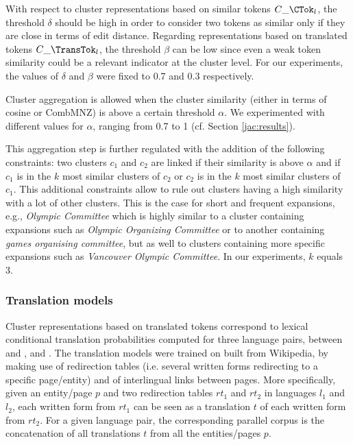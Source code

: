 \documentclass[output=paper]{langsci/langscibook}
\begin{document}
With respect to cluster representations based on similar tokens
$C\_\CTok_{l}$, the threshold $\delta$ should be high in order to
consider two tokens as similar only if they are close in terms of edit
distance. Regarding representations based on translated tokens
$C\_\TransTok_{l}$, the threshold $\beta$ can be low since even a weak
token similarity could be a relevant indicator at the cluster
level. For our experiments, the values of $\delta$ and $\beta$ were
fixed to 0.7 and 0.3 respectively.

Cluster aggregation is allowed when the cluster similarity (either in terms of cosine or
CombMNZ) is above a certain threshold $\alpha$. We experimented with
different values for $\alpha$, ranging from 0.7 to 1 (cf. Section
\ref{jac:results}).

This aggregation step is further regulated with the addition of the
following constraints: two clusters $c_1$ and $c_2$ are linked if
their similarity is above $\alpha$ and if $c_1$ is in the $k$ most
similar clusters of $c_2$ or $c_2$ is in the $k$ most similar clusters
of $c_1$. This additional constraints allow to rule out clusters
having a high similarity with a lot of other clusters.  This is the
case for short and frequent expansions, e.g., \textit{Olympic
  Committee} which is highly similar to a cluster containing
expansions such as \textit{Olympic Organizing Committee} or to another
containing \textit{games organising committee}, but as well to
clusters containing more specific expansions such as \textit{Vancouver
  Olympic Committee}. In our experiments, $k$ equals 3.


\subsubsection{Translation models}
\label{jac:trans}
Cluster representations based on translated tokens correspond to
lexical conditional translation probabilities computed for three
language pairs, between  and ,  and . The
translation models were trained on  built from
Wikipedia, by making use of redirection tables (i.e. several written
forms redirecting to a specific page/entity) and of interlingual links
between pages.  More specifically, given an entity/page $p$ and two
redirection tables $rt_1$ and $rt_2$ in languages $l_1$ and $l_2$,
each written form from $rt_1$ can be seen as a translation $t$ of each
written form from $rt_2$. For a given language pair, the corresponding
parallel corpus is the concatenation of all translations $t$ from all
the entities/pages $p$.
\end{document}
